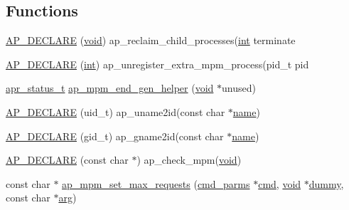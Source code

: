 \subsection*{Functions}
\begin{DoxyCompactItemize}
\item 
\hyperlink{group__APACHE__MPM_ga11d582782fcc0883f4a6c2fc9989cd34}{A\+P\+\_\+\+D\+E\+C\+L\+A\+RE} (\hyperlink{group__MOD__ISAPI_gacd6cdbf73df3d9eed42fa493d9b621a6}{void}) ap\+\_\+reclaim\+\_\+child\+\_\+processes(\hyperlink{pcre_8txt_a42dfa4ff673c82d8efe7144098fbc198}{int} terminate
\item 
\hyperlink{group__APACHE__MPM_ga8a1d5d59043063bc3d47d71fb2c6ffeb}{A\+P\+\_\+\+D\+E\+C\+L\+A\+RE} (\hyperlink{pcre_8txt_a42dfa4ff673c82d8efe7144098fbc198}{int}) ap\+\_\+unregister\+\_\+extra\+\_\+mpm\+\_\+process(pid\+\_\+t pid
\item 
\hyperlink{group__apr__errno_gaa5105fa83cc322f09382292db8b47593}{apr\+\_\+status\+\_\+t} \hyperlink{group__APACHE__MPM_gacb256f39e67df3a2f22c6027c284527e}{ap\+\_\+mpm\+\_\+end\+\_\+gen\+\_\+helper} (\hyperlink{group__MOD__ISAPI_gacd6cdbf73df3d9eed42fa493d9b621a6}{void} $\ast$unused)
\item 
\hyperlink{group__APACHE__MPM_ga977d8d62cf49a2ed635603aaea40e813}{A\+P\+\_\+\+D\+E\+C\+L\+A\+RE} (uid\+\_\+t) ap\+\_\+uname2id(const char $\ast$\hyperlink{pcre_8txt_a5a15d68aadb41c771fe50a27c400d49b}{name})
\item 
\hyperlink{group__APACHE__MPM_ga2d15ccb47c1cfc081c2370493e30ca93}{A\+P\+\_\+\+D\+E\+C\+L\+A\+RE} (gid\+\_\+t) ap\+\_\+gname2id(const char $\ast$\hyperlink{pcre_8txt_a5a15d68aadb41c771fe50a27c400d49b}{name})
\item 
\hyperlink{group__APACHE__MPM_ga4457bdd925119cd4d5d3d25eb09c0528}{A\+P\+\_\+\+D\+E\+C\+L\+A\+RE} (const char $\ast$) ap\+\_\+check\+\_\+mpm(\hyperlink{group__MOD__ISAPI_gacd6cdbf73df3d9eed42fa493d9b621a6}{void})
\item 
const char $\ast$ \hyperlink{group__APACHE__MPM_ga6a735f991ab5e3cea1fab92c15d8ac6e}{ap\+\_\+mpm\+\_\+set\+\_\+max\+\_\+requests} (\hyperlink{group__APACHE__CORE__CONFIG_ga1791fbd28d06a9847bad001541c5241e}{cmd\+\_\+parms} $\ast$\hyperlink{group__apr__thread__proc_ga7b715f5a87a71c6766684c1798251237}{cmd}, \hyperlink{group__MOD__ISAPI_gacd6cdbf73df3d9eed42fa493d9b621a6}{void} $\ast$\hyperlink{modules_2cache_2mod__cache__socache_8c_a7c1d654b7b6114d7a0abc8d351dd1bcd}{dummy}, const char $\ast$\hyperlink{group__APACHE__CORE__MUTEX_gaf6517210150d97cd5cb8a17e3768770d}{arg})
\item 

\end{DoxyCompactItemize}
